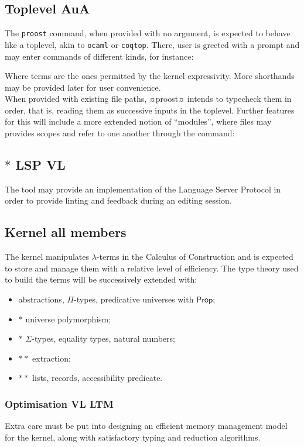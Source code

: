 \documentclass[twocolumn]{article}
\newcommand{\members}[1]{\texorpdfstring{\hfill\scriptsize #1}{}}
\begin{document}
\subsection{Toplevel  \members{AuA}}
The \texttt{proost} command, when provided with no argument, is expected to behave like
a toplevel, akin to \texttt{ocaml} or \texttt{coqtop}. There, user is greeted with a
prompt and may enter commands of different kinds, for instance:

Where terms are the ones permitted by the kernel expressivity.
More shorthands may be provided later for user convenience.\\

When provided with existing file paths, ¤proost¤ intends to typecheck them in
order, that is, reading them as successive inputs in the toplevel. Further
features for this will include a more extended notion of ``modules'', where files
may provides scopes and refer to one another through the command:


\subsection{\texorpdfstring{\(*\)}{*} LSP \members{VL}}
The tool may provide an implementation of the Language Server Protocol in
order to provide linting and feedback during an editing session.


\subsection{Kernel \members{all members}}
The kernel manipulates \(\lambda\)-terms in the Calculus of Construction and is
expected to store and manage them with a relative level of efficiency.
The type theory used to build the terms will be successively extended with:
\begin{itemize}
  \item abstractions, \(\Pi\)-types, predicative universes with \(\mathsf{Prop}\);
  \item \(*\) universe polymorphism;
  \item \(*\) \(\Sigma\)-types, equality types, natural numbers;
  \item \(**\) extraction;
  \item \(**\) lists, records, accessibility predicate.
\end{itemize}


\subsubsection{Optimisation \members{VL LTM}}
Extra care must be put into designing an efficient memory management model for
the kernel, along with satisfactory typing and reduction algorithms.
\end{document}
